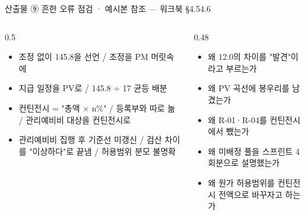 \begin{frame}{산출물 ⑨ 흔한 오류 점검 · 예시본 참조 — 워크북 §4.5\til{}4.6}
\begin{columns}[T]
\begin{column}{0.5\textwidth}
\begin{itemize}
\item 조정 없이 145.8을 선언 / 조정을 PM 머릿속에
\item 지급 일정을 PV로 / 145.8 ÷ 17 균등 배분
\item 컨틴전시 = "총액 × n\%" / 등록부와 따로 놂 / 관리예비비 대상을 컨틴전시로
\item 관리예비비 집행 후 기준선 미갱신 / 검산 차이를 "이상하다"로 끝냄 / 허용범위 분모 불명확
\end{itemize}
\end{column}
\begin{column}{0.48\textwidth}
\begin{itemize}
\item 왜 12.0의 차이를 "발견"이라고 부르는가
\item 왜 PV 곡선에 봉우리를 남겼는가
\item 왜 R-01·R-04를 컨틴전시에서 뺐는가
\item 왜 미배정 풀을 스프린트 4회분으로 설명했는가
\item 왜 원가 허용범위를 컨틴전시 전액으로 바꾸자고 하는가
\end{itemize}
\end{column}
\end{columns}
\end{frame}

